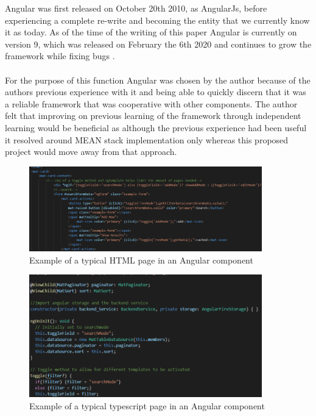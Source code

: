 Angular was first released on October 20th 2010, as AngularJs, before experiencing a complete re-write and becoming the entity that we currently know it as today. As of the time of the writing of this paper Angular is currently on version 9, which was released on February the 6th 2020 and continues to grow the framework while fixing bugs \cite{angular}. \\ \\
For the purpose of this function Angular was chosen by the author because of the authors previous experience with it and being able to quickly discern that it was a reliable framework that was cooperative with other components. The author felt that improving on previous learning of the framework through independent learning would be beneficial as although the previous experience had been useful it resolved around MEAN stack implementation only whereas this proposed project would move away from that approach. \\
\begin{figure}[h!]
	\caption{Example of a typical HTML page in an Angular component}
	\centering
	\includegraphics[width=0.9\textwidth]{images/angularhtml.png}
\end{figure}

\begin{figure}[h!]
	\caption{Example of a typical typescript page in an Angular component}
	\centering
	\includegraphics[width=0.9\textwidth]{images/angularts.png}
\end{figure}

